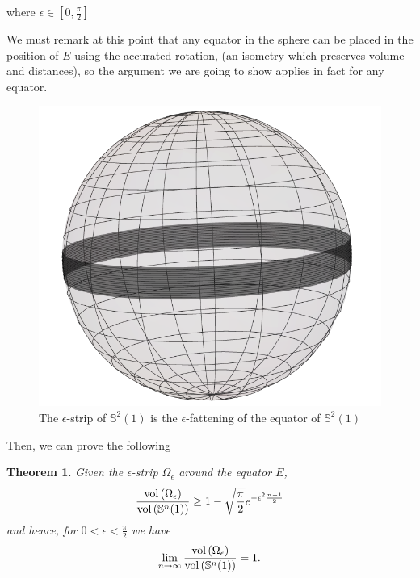 \documentclass[11pt,letterpaper]{amsart}
\newtheorem{theoremA}{Theorem}
\theoremstyle{definition}
\theoremstyle{remark}
\begin{document}
\noindent where $\epsilon \in [0,\frac{\pi}{2}]$

We must remark at this point that any equator in the sphere can be placed in the position of $E$ using the accurated rotation, (an isometry which preserves volume and distances), so the argument we are going to show applies in fact for any equator.


\begin{center}
\begin{figure}
    \centering
    \includegraphics[scale=0.35]{banda}
    \caption{The $\epsilon$-strip of $\mathbb{S}^2(1)$ is the $\epsilon$-fattening of the equator of $\mathbb{S}^2(1)$}\label{fig:e-strip}
\end{figure}
\end{center}

Then, we can prove the following
\begin{theoremA}\label{equator}
Given the $\epsilon$-strip $\Omega_\epsilon$ around the equator $E$, 
\begin{equation}\label{eq2.5}
\frac{{\rm vol}\left(\Omega_\epsilon\right)}{{\rm vol}\left(\mathbb{S}^n(1)\right)}\geq 1-\sqrt{\frac{\pi}{2}}e^{-\epsilon^2\frac{n-1}{2}}
\end{equation}
 and hence, for $0<\epsilon<\frac{\pi}{2}$ we have
\begin{equation}\label{eq2.5.1}
\lim_{n\to \infty}\frac{{\rm vol}\left(\Omega_\epsilon\right)}{{\rm vol}\left(\mathbb{S}^n(1)\right)}=1.
\end{equation}
\end{theoremA}
\end{document}
